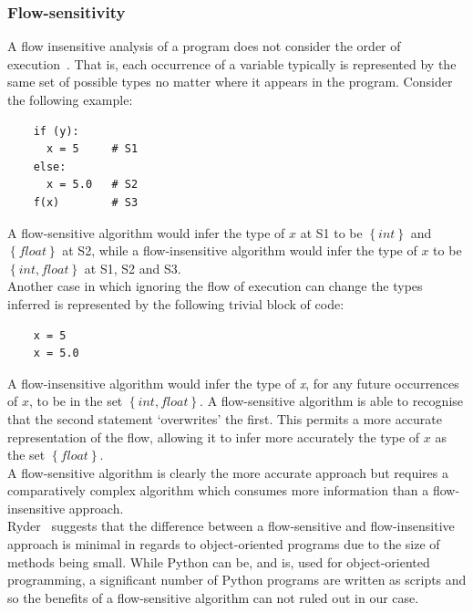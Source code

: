 \documentclass[12pt, titlepage]{article}
\begin{document}
\subsubsection{Flow-sensitivity}
A flow insensitive analysis of a program does not consider the order of execution~\cite{nielson99}. That is, each occurrence of a variable typically is represented by the same set of possible types no matter where it appears in the program. Consider the following example:
\begin{lstlisting}
    if (y):	
      x = 5     # S1
    else:
      x = 5.0   # S2
    f(x)        # S3
\end{lstlisting}
A flow-sensitive algorithm would infer the type of $x$ at S1 to be $\left\{ {int}\right\}$ and $\left\{ {float}\right\}$ at S2, while a flow-insensitive algorithm would infer the type of $x$ to be $\left\{ {int, float}\right\}$ at S1, S2 and S3. \\
Another case in which ignoring the flow of execution can change the types inferred is represented by the following trivial block of code:
\begin{lstlisting}
    x = 5
    x = 5.0
\end{lstlisting}
A flow-insensitive algorithm would infer the type of \textit{x}, for any future occurrences of $x$, to be in the set $\left\{ {int, float}\right\}$. A flow-sensitive algorithm is able to recognise that the second statement `overwrites' the first. This permits a more accurate representation of the flow, allowing it to infer more accurately the type of $x$ as the set $\left\{ {float}\right\}$. \\
A flow-sensitive algorithm is clearly the more accurate approach but requires a comparatively complex algorithm which consumes more information than a flow-insensitive approach. \\
Ryder~\cite{ryder03} suggests that the difference between a flow-sensitive and flow-insensitive approach is minimal in regards to object-oriented programs due to the size of methods being small. While Python can be, and is, used for object-oriented programming, a significant number of Python programs are written as scripts and so the benefits of a flow-sensitive algorithm can not ruled out in our case.
\end{document}
